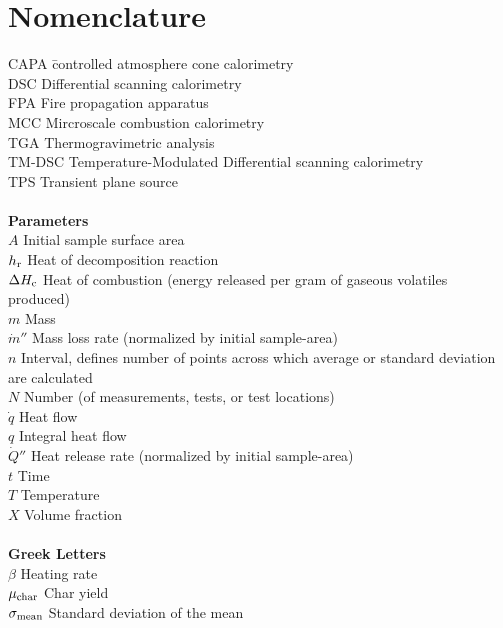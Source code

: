 \chapter{Nomenclature}
\label{nomenclature}
\vspace*{-10mm}
\begin{tabbing}
	CAPA		\hspace{1in}\= controlled atmosphere cone calorimetry\\
	DSC						\>Differential scanning calorimetry\\
	FPA		        		\> Fire propagation apparatus\\
	MCC		        		\> Mircroscale combustion calorimetry\\
	TGA		        		\> Thermogravimetric analysis\\
	TM-DSC					\>Temperature-Modulated Differential scanning calorimetry\\
	TPS		        		\> Transient plane source\\
	
	\hspace{0.1in}            		\> \\
	{\bf  Parameters}       	\> \\
	$A$		        		\> Initial sample surface area\\
	$h_{\rm r}$        		\> Heat of decomposition reaction\\
	$\Delta H_{\rm c}$		\> Heat of combustion (energy released per gram of gaseous volatiles produced)\\
	$m$		        		\> Mass\\
	$\dot{m}''$				\> Mass loss rate (normalized by initial sample-area)\\
	$n$						\> Interval, defines number of points across which  average or standard deviation are calculated\\
	$N$		        		\> Number (of measurements, tests, or test locations)\\
	$\dot{q}$		     	\> Heat flow\\
	$q$		        		\> Integral heat flow\\
	$\dot{Q}''$				\> Heat release rate (normalized by initial sample-area)\\
	$t$						\> Time\\
	$T$						\> Temperature \\
	$X$               		\> Volume fraction \\
	
	\hspace{0.1in}            	\> \\
	{\bf Greek Letters}       	\> \\
	$\beta$               	\> Heating rate\\
	$\mu_{\rm char}$		\> Char yield\\
	$\sigma_{\rm mean}$   	 	\> Standard deviation of the mean \\
	

\end{tabbing}
